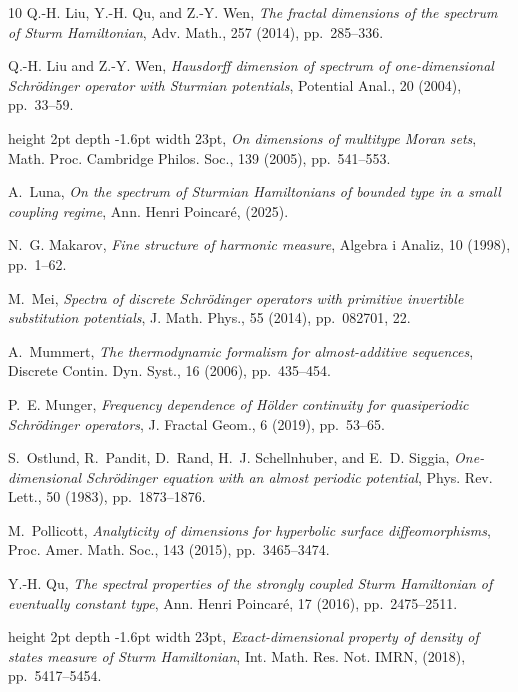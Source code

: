 \documentclass[reqno,11pt,graphicx,]{amsart}
\numberwithin{equation}{section}
\theoremstyle{plain}
\newcommand{\3}{\mathbf{3}}
\begin{document}
\begin{thebibliography}{10}
{\sc Q.-H. Liu, Y.-H. Qu, and Z.-Y. Wen}, {\em The fractal dimensions of the
  spectrum of {S}turm {H}amiltonian}, Adv. Math., 257 (2014), pp.~285--336.

{\sc Q.-H. Liu and Z.-Y. Wen}, {\em Hausdorff dimension of spectrum of
  one-dimensional {S}chr\"odinger operator with {S}turmian potentials},
  Potential Anal., 20 (2004), pp.~33--59.

\leavevmode\vrule height 2pt depth -1.6pt width 23pt, {\em On dimensions of
  multitype {M}oran sets}, Math. Proc. Cambridge Philos. Soc., 139 (2005),
  pp.~541--553.

{\sc A.~Luna}, {\em On the spectrum of {S}turmian {H}amiltonians of bounded
  type in a small coupling regime}, Ann. Henri Poincaré,  (2025).

{\sc N.~G. Makarov}, {\em Fine structure of harmonic measure}, Algebra i
  Analiz, 10 (1998), pp.~1--62.

{\sc M.~Mei}, {\em Spectra of discrete {S}chr\"odinger operators with primitive
  invertible substitution potentials}, J. Math. Phys., 55 (2014), pp.~082701,
  22.

{\sc A.~Mummert}, {\em The thermodynamic formalism for almost-additive
  sequences}, Discrete Contin. Dyn. Syst., 16 (2006), pp.~435--454.

{\sc P.~E. Munger}, {\em Frequency dependence of {H}\"{o}lder continuity for
  quasiperiodic {S}chr\"{o}dinger operators}, J. Fractal Geom., 6 (2019),
  pp.~53--65.

{\sc S.~Ostlund, R.~Pandit, D.~Rand, H.~J. Schellnhuber, and E.~D. Siggia},
  {\em One-dimensional {S}chr\"{o}dinger equation with an almost periodic
  potential}, Phys. Rev. Lett., 50 (1983), pp.~1873--1876.

{\sc M.~Pollicott}, {\em Analyticity of dimensions for hyperbolic surface
  diffeomorphisms}, Proc. Amer. Math. Soc., 143 (2015), pp.~3465--3474.

{\sc Y.-H. Qu}, {\em The spectral properties of the strongly coupled {S}turm
  {H}amiltonian of eventually constant type}, Ann. Henri Poincar\'e, 17 (2016),
  pp.~2475--2511.

\leavevmode\vrule height 2pt depth -1.6pt width 23pt, {\em Exact-dimensional
  property of density of states measure of {S}turm {H}amiltonian}, Int. Math.
  Res. Not. IMRN,  (2018), pp.~5417--5454.


\end{thebibliography}
\end{document}
